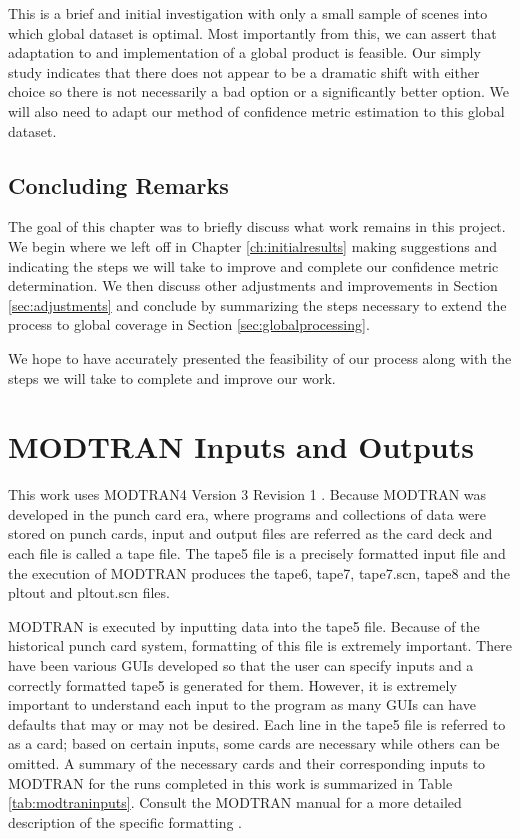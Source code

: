 \documentclass{book}
\begin{document}
This is a brief and initial investigation with only a small sample of scenes into which global dataset is optimal.  Most importantly from this, we can assert that adaptation to and implementation of a global product is feasible.  Our simply study indicates that there does not appear to be a dramatic shift with either choice so there is not necessarily a bad option or a significantly better option.  We will also need to adapt our method of confidence metric estimation to this global dataset.

\section{Concluding Remarks}

The goal of this chapter was to briefly discuss what work remains in this project.  We begin where we left off in Chapter \ref{ch:initialresults} making suggestions and indicating the steps we will take to improve and complete our confidence metric determination.  We then discuss other adjustments and improvements in Section \ref{sec:adjustments} and conclude by summarizing the steps necessary to extend the process to global coverage in Section \ref{sec:globalprocessing}.

We hope to have accurately presented the feasibility of our process along with the steps we will take to complete and improve our work.


\appendix
\chapter{MODTRAN Inputs and Outputs}
\label{app:modtranIO}

This work uses MODTRAN4 Version 3 Revision 1 \cite{modtran}.  Because MODTRAN was developed in the punch card era, where programs and collections of data were stored on punch cards, input and output files are referred as the card deck and each file is called a tape file.  The tape5 file is a precisely formatted input file and the execution of MODTRAN produces the tape6, tape7, tape7.scn, tape8 and the pltout and pltout.scn files.

MODTRAN is executed by inputting data into the tape5 file.  Because of the historical punch card system, formatting of this file is extremely important.  There have been various GUIs developed so that the user can specify inputs and a correctly formatted tape5 is generated for them.  However, it is extremely important to understand each input to the program as many GUIs can have defaults that may or may not be desired.  Each line in the tape5 file is referred to as a card; based on certain inputs, some cards are necessary while others can be omitted.  A summary of the necessary cards and their corresponding inputs to MODTRAN for the runs completed in this work is summarized in Table \ref{tab:modtraninputs}.  Consult the MODTRAN manual for a more detailed description of the specific formatting \cite{modtran}.
\end{document}
